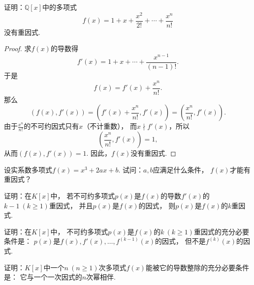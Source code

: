 \begin{example}
证明：\(\mathbb{Q}[x]\)中的多项式\begin{equation*}
	f(x) = 1+x+\frac{x^2}{2!}+\dotsb+\frac{x^n}{n!}
\end{equation*}没有重因式.
\begin{proof}
求\(f(x)\)的导数得\begin{equation*}
	f'(x) = 1+x+\dotsm+\frac{x^{n-1}}{(n-1)!}.
\end{equation*}
于是\begin{equation*}
	f(x) = f'(x) + \frac{x^n}{n!}.
\end{equation*}
那么\begin{equation*}
	(f(x),f'(x))
	= \left(
		f'(x)+\frac{x^n}{n!},
		f'(x)
	\right)
	= \left(
		\frac{x^n}{n!},
		f'(x)
	\right).
\end{equation*}
由于\(\frac{x^n}{n!}\)的不可约因式只有\(x\)（不计重数），
而\(x \nmid f'(x)\)，所以\begin{equation*}
	\left(
		\frac{x^n}{n!},
		f'(x)
	\right)
	= 1,
\end{equation*}
从而\((f(x),f'(x))=1\).
因此，\(f(x)\)没有重因式.
\end{proof}
\end{example}

\begin{example}
设实系数多项式\(f(x)=x^3+2ax+b\).
试问：\(a,b\)应满足什么条件，
\(f(x)\)才能有重因式？
\begin{solution}

\end{solution}
\end{example}

\begin{example}
证明：在\(K[x]\)中，
若不可约多项式\(p(x)\)是\(f(x)\)的导数\(f'(x)\)的\(k-1\ (k\geq1)\)重因式，
并且\(p(x)\)是\(f(x)\)的因式，
则\(p(x)\)是\(f(x)\)的\(k\)重因式.
\end{example}

\begin{example}
证明：在\(K[x]\)中，
不可约多项式\(p(x)\)是\(f(x)\)的\(k\ (k\geq1)\)重因式的充分必要条件是：
\(p(x)\)是\(f(x),f'(x),\dotsc,f^{(k-1)}(x)\)的因式，
但不是\(f^{(k)}(x)\)的因式.
\end{example}

\begin{example}
证明：\(K[x]\)中一个\(n\ (n\geq1)\)次多项式\(f(x)\)能被它的导数整除的充分必要条件是：
它与一个一次因式的\(n\)次幂相伴.
\end{example}
